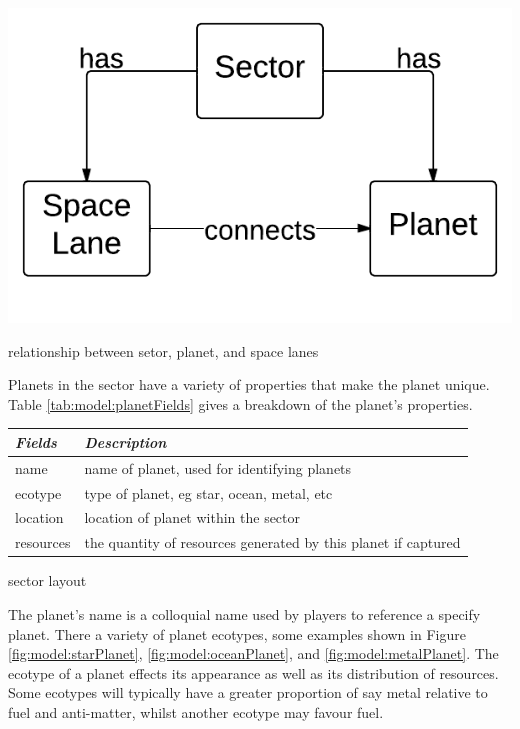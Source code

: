 \begin{marginfigure}
	\includegraphics{res/model/sector.pdf}
	\caption{relationship between setor, planet, and space lanes}
	\label{fig:model:sectorRelation}
\end{marginfigure}

Planets in the sector have a variety of properties that make the planet unique.
Table \ref{tab:model:planetFields} gives a breakdown of the planet's properties.

\begin{margintable}
    \begin{tabular}{p{4em} p{11em}}
    \toprule
    \emph{Fields} & \emph{Description} \\
    \midrule
    name & name of planet, used for identifying planets \\
    ecotype & type of planet, eg star, ocean, metal, etc \\
    location & location of planet within the sector \\
    resources & the quantity of resources generated by this planet if captured\\
    \bottomrule
    \end{tabular}
    	\vspace{1em}
	\caption{sector layout}
	\label{tab:model:planetFields}
\end{margintable}

The planet's name is a colloquial name used by players to reference a specify planet.
There a variety of planet ecotypes, some examples shown in Figure \ref{fig:model:starPlanet}, \ref{fig:model:oceanPlanet}, and \ref{fig:model:metalPlanet}.
The ecotype of a planet effects its appearance as well as its distribution of resources.
Some ecotypes will typically have a greater proportion of say metal relative to fuel and anti-matter, whilst another ecotype may favour fuel.

